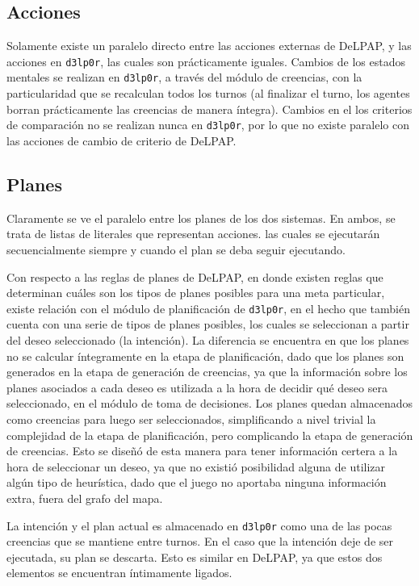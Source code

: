 \subsection{Acciones}

Solamente existe un paralelo directo entre las acciones externas de DeLPAP, y las acciones en \texttt{d3lp0r}, 
las cuales son prácticamente iguales. Cambios de los estados mentales se realizan en \texttt{d3lp0r}, a través
del módulo de creencias, con la particularidad que se recalculan todos los turnos (al finalizar el
turno, los agentes borran prácticamente las creencias de manera íntegra). Cambios en el los criterios
de comparación no se realizan nunca en \texttt{d3lp0r}, por lo que no existe paralelo con las acciones de
cambio de criterio de DeLPAP.

\subsection{Planes}

Claramente se ve el paralelo entre los planes de los dos sistemas. En ambos, se trata de listas de 
literales que representan acciones. las cuales se ejecutarán secuencialmente siempre y cuando el plan
se deba seguir ejecutando.

Con respecto a las reglas de planes de DeLPAP, en donde existen reglas que determinan cuáles son los
tipos de planes posibles para una meta particular, existe relación con el módulo de planificación de
\texttt{d3lp0r}, en el hecho que también cuenta con una serie de tipos de planes posibles, los cuales se 
seleccionan a partir del deseo seleccionado (la intención). La diferencia se encuentra en que los 
planes no se calcular íntegramente en la etapa de planificación, dado que los planes son generados en 
la etapa de generación de creencias, ya que la información sobre los planes asociados a cada deseo es
utilizada a la hora de decidir qué deseo sera seleccionado, en el módulo de toma de decisiones. Los 
planes quedan almacenados como creencias para luego ser seleccionados, simplificando a nivel trivial 
la complejidad de la etapa de planificación, pero complicando la etapa de generación de creencias. 
Esto se diseñó de esta manera para tener información certera a la hora de seleccionar un deseo, ya que
no existió posibilidad alguna de utilizar algún tipo de heurística, dado que el juego no aportaba
ninguna información extra, fuera del grafo del mapa.

La intención y el plan actual es almacenado en \texttt{d3lp0r} como una de las pocas creencias que se mantiene
entre turnos. En el caso que la intención deje de ser ejecutada, su plan se descarta. Esto es similar
en DeLPAP, ya que estos dos elementos se encuentran íntimamente ligados.

